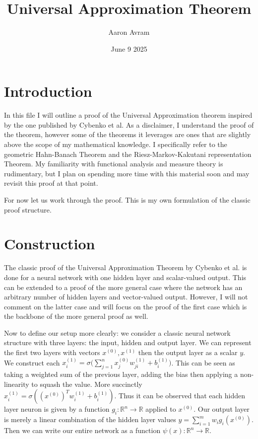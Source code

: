 \documentclass[12pt]{article}
\title{Universal Approximation Theorem}
\author{Aaron Avram}
\date{June 9 2025}
\begin{document}
\maketitle

\section*{Introduction}
In this file I will outline a proof of the Universal Approximation theorem inspired by the one published by Cybenko et al. As a disclaimer, I understand
the proof of the theorem, however some of the theorems it leverages are ones that are slightly above the scope of my mathematical knowledge. I specifically
refer to the geometric Hahn-Banach Theorem and the Riesz-Markov-Kakutani representation Theorem. My familiarity with functional analysis and measure theory is
rudimentary, but I plan on spending more time with this material soon and may revisit this proof at that point.


For now let us work through the proof. This is my own formulation of the classic proof structure.

\section*{Construction}
The classic proof of the Universal Approximation Theorem by Cybenko et al. is done for a
neural network with one hidden layer and scalar-valued output. This can be extended
to a proof of the more general case where the network has an arbitrary number of
hidden layers and vector-valued output. However, I will not comment on the latter case
and will focus on the proof of the first case which is the backbone of the more general
proof as well.


Now to define our setup more clearly: we consider a classic neural network
structure with three layers: the input, hidden and output layer. We can represent
the first two layers with vectors $x^{(0)}, x^{(1)}$ then the output layer as a scalar
$y$. We construct each $x^{(1)}_i = \displaystyle \sigma\Big(\sum_{j = 1}^{n}x^{(0)}_jw^{(1)}_{ji} + b^{(1)}_i\Big)$. This can be seen
as taking a weighted sum of the previous layer, adding the bias then applying a non-linearity to squash the value.
More succinctly $x^{(1)}_i = \displaystyle \sigma((x^{(0)})^Tw^{(1)}_i + b^{(1)}_i)$. Thus it can be observed that
each hidden layer neuron is given by a function $g_i: \mathbb{R}^n \to \mathbb{R}$ applied to $x^{(0)}$. Our output layer
is merely a linear combination of the hidden layer values $y = \displaystyle \sum_{i = 1}^{m}w_ig_i(x^{(0)})$. Then we can write
our entire network as a function $\psi(x): \mathbb{R}^n \to \mathbb{R}$.
\end{document}
